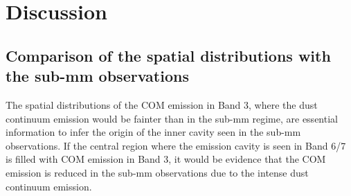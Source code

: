 \documentclass[linenumbers, twocolumn, twocolappendix, astrosymb, times]{aastex631}
\newcommand{\methanol}{CH$_3$OH\xspace}
\newcommand{\acetaldehyde}{CH$_3$CHO\xspace}
\newcommand{\methylformate}{CH$_3$OCHO\xspace}
\begin{document}





\section{Discussion} \label{sec:discussion}
\subsection{Comparison of the spatial distributions with the sub-mm observations}
The spatial distributions of the COM emission in Band 3, where the dust continuum emission would be fainter than in the sub-mm regime, are essential information to infer the origin of the inner cavity seen in the sub-mm observations. If the central region where the emission cavity is seen in Band 6/7 is filled with COM emission in Band 3, it would be evidence that the COM emission is reduced in the sub-mm observations due to the intense dust continuum emission. 
\end{document}
